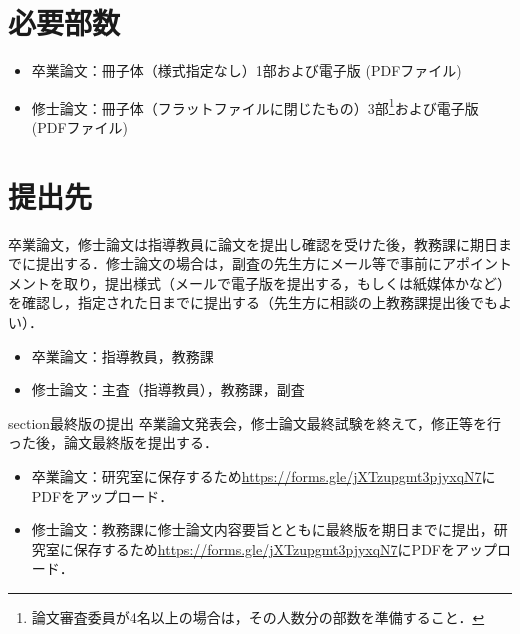 


    \section{必要部数}
        \begin{itemize}
            \item 卒業論文：冊子体（様式指定なし）1部および電子版 (PDFファイル)
            \item 修士論文：冊子体（フラットファイルに閉じたもの）3部\footnote{論文審査委員が4名以上の場合は，その人数分の部数を準備すること．}および電子版 (PDFファイル)
        \end{itemize}

    \section{提出先}
    卒業論文，修士論文は指導教員に論文を提出し確認を受けた後，教務課に期日までに提出する．修士論文の場合は，副査の先生方にメール等で事前にアポイントメントを取り，提出様式（メールで電子版を提出する，もしくは紙媒体かなど）を確認し，指定された日までに提出する（先生方に相談の上教務課提出後でもよい）．
        \begin{itemize}
            \item 卒業論文：指導教員，教務課
            \item 修士論文：主査（指導教員），教務課，副査
        \end{itemize}

    section{最終版の提出}
    卒業論文発表会，修士論文最終試験を終えて，修正等を行った後，論文最終版を提出する．
        \begin{itemize}
            \item 卒業論文：研究室に保存するため\url{https://forms.gle/jXTzupgmt3pjyxqN7}にPDFをアップロード．
            \item 修士論文：教務課に修士論文内容要旨とともに最終版を期日までに提出，研究室に保存するため\url{https://forms.gle/jXTzupgmt3pjyxqN7}にPDFをアップロード．
        \end{itemize}